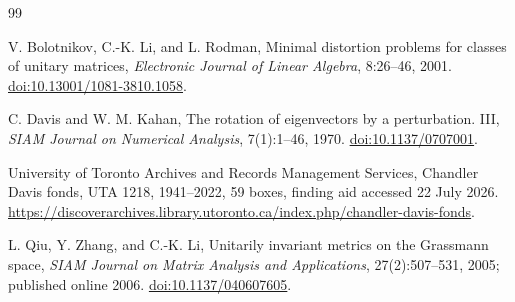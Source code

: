 \documentclass[11pt]{article}
\theoremstyle{definition}
\begin{document}
\begin{thebibliography}{99}

V. Bolotnikov, C.-K. Li, and L. Rodman,
\newblock Minimal distortion problems for classes of unitary matrices,
\newblock \emph{Electronic Journal of Linear Algebra}, 8:26--46, 2001.
\newblock \href{https://doi.org/10.13001/1081-3810.1058}{doi:10.13001/1081-3810.1058}.

C. Davis and W. M. Kahan,
\newblock The rotation of eigenvectors by a perturbation. III,
\newblock \emph{SIAM Journal on Numerical Analysis}, 7(1):1--46, 1970.
\newblock \href{https://doi.org/10.1137/0707001}{doi:10.1137/0707001}.


University of Toronto Archives and Records Management Services,
\newblock Chandler Davis fonds, UTA 1218, 1941--2022, 59 boxes,
\newblock finding aid accessed 22 July 2026.
\newblock \url{https://discoverarchives.library.utoronto.ca/index.php/chandler-davis-fonds}.

L. Qiu, Y. Zhang, and C.-K. Li,
\newblock Unitarily invariant metrics on the Grassmann space,
\newblock \emph{SIAM Journal on Matrix Analysis and Applications},
27(2):507--531, 2005; published online 2006.
\newblock \href{https://doi.org/10.1137/040607605}{doi:10.1137/040607605}.

\end{thebibliography}
\end{document}
